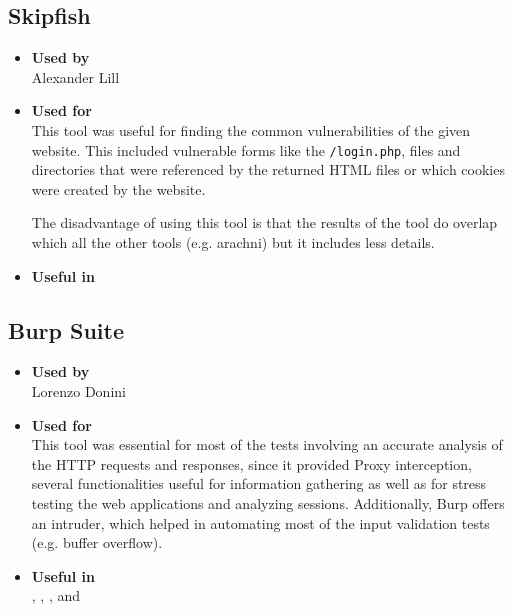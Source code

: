 \subsection*{Skipfish}
\begin{itemize}
	\item \textbf{Used by}\\ Alexander Lill
	\item \textbf{Used for}\\ This tool was useful for finding the common vulnerabilities of the given website. This included vulnerable forms like the \texttt{/login.php}, files and directories that were referenced by the returned HTML files or which cookies were created by the website.
	
	The disadvantage of using this tool is that the results of the tool do overlap which all the other tools (e.g. arachni) but it includes less details.
	\item \textbf{Useful in}\\ 
\end{itemize}

\subsection*{Burp Suite}
\begin{itemize}
	\item \textbf{Used by}\\ Lorenzo Donini
	\item \textbf{Used for}\\ This tool was essential for most of the tests involving an accurate analysis of the HTTP requests and responses, since it provided Proxy interception, several functionalities useful for information gathering as well as for stress testing the web applications and analyzing sessions. Additionally, Burp offers an intruder, which helped in automating most of the input validation tests (e.g. buffer overflow).
	\item \textbf{Useful in}\\ , , ,  and 
\end{itemize}

